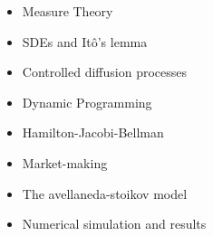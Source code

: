 \begin{itemize}
    \item Measure Theory
    \item SDEs and It\^{o}'s lemma
    \item Controlled diffusion processes
    \item Dynamic Programming
    \item Hamilton-Jacobi-Bellman
    \item Market-making
    \item The avellaneda-stoikov model
    \item Numerical simulation and results
\end{itemize}